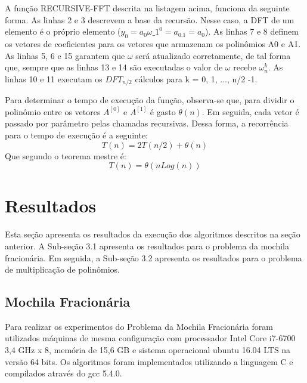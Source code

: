 \documentclass[
	12pt,				%
	oneside,			%
	a4paper,			%
	english,			%
	french,				%
	spanish,			%
	brazil,				%
	]{abntex2}
\begin{document}
A função RECURSIVE-FFT descrita na listagem acima, funciona da seguinte forma. As linhas 2 e 3 descrevem a base da recursão. Nesse caso, a DFT de um elemento é o próprio elemento (\( y_0 = a_0 \omega\_1^0 = a_0.1 = a_0\)). As linhas 7 e 8 definem os vetores de coeficientes para os vetores que armazenam os polinômios A0 e A1. As linhas 5, 6 e 15 garantem que \(\omega\) será atualizado corretamente, de tal forma que, sempre que as linhas 13 e 14 são executadas o valor de \(\omega\) recebe \(\omega_n^k\). As linhas 10 e 11 executam os \(DFT_{n/2}\) cálculos para k = 0, 1, ..., n/2 -1.

Para determinar o tempo de execução da função, observa-se que, para dividir o polinômio entre os vetores \(A^{[0]}\) e \(A^{[1]}\) é gasto \( \theta(n) \). Em seguida, cada vetor é passado por parâmetro pelas chamadas recursivas. Dessa forma, a recorrência para o tempo de execução é a seguinte:
\[T(n) = 2T(n/2) + \theta(n)\]
Que segundo o teorema mestre é:
\[T(n) = \theta(nLog(n))\]

\chapter{Resultados}
Esta seção apresenta os resultados da execução dos algoritmos descritos na seção anterior. A Sub-seção 3.1 apresenta os resultados para o problema da mochila fracionária. Em seguida, a Sub-seção 3.2 apresenta os resultados para o problema de multiplicação de polinômios.

\section{Mochila Fracionária}

Para realizar os experimentos do Problema da Mochila Fracionária foram utilizados máquinas de mesma configuração com processador Intel Core i7-6700 3,4 GHz x 8, memória de 15,6 GB e sistema operacional ubuntu 16.04 LTS na versão 64 bits. Os algoritmos foram implementados utilizando a linguagem C e compilados através do gcc 5.4.0.
 
\end{document}
